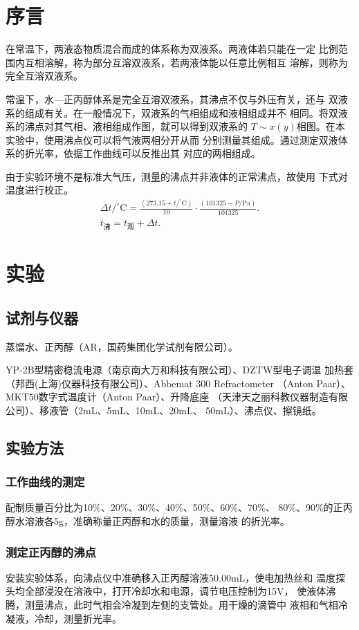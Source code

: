 \documentclass[12pt]{ctexart}
\numberwithin{equation}{section}
\begin{document}
\section{序言}
在常温下，两液态物质混合而成的体系称为双液系。两液体若只能在一定
比例范围内互相溶解，称为部分互溶双液系，若两液体能以任意比例相互
溶解，则称为完全互溶双液系。

常温下，水—正丙醇体系是完全互溶双液系，其沸点不仅与外压有关，还与
双液系的组成有关。在一般情况下，双液系的气相组成和液相组成并不
相同。将双液系的沸点对其气相、液相组成作图，就可以得到双液系的
$T\sim x(y)$相图。在本实验中，使用沸点仪可以将气液两相分开从而
分别测量其组成。通过测定双液体系的折光率，依据工作曲线可以反推出其
对应的两相组成。

由于实验环境不是标准大气压，测量的沸点并非液体的正常沸点，故使用
下式对温度进行校正。
\begin{gather}
    \Delta t / ^\circ\text{C}
    = \frac{(273.15 + t/^\circ\text{C})}{10}
    \cdot \frac{(101325 - P/\text{Pa})}{101325}. \\
    t_{\text{沸}} = t_{\text{观}} + \Delta t.
\end{gather}

\section{实验}
\subsection{试剂与仪器}
蒸馏水、正丙醇（AR，国药集团化学试剂有限公司）。

YP-2B型精密稳流电源（南京南大万和科技有限公司）、DZTW型电子调温
加热套（邦西(上海)仪器科技有限公司）、Abbemat 300 Refractometer
（Anton Paar）、MKT50数字式温度计（Anton Paar）、升降底座
（天津天之丽科教仪器制造有限公司）、移液管（2mL、5mL、10mL、20mL、
50mL）、沸点仪、擦镜纸。

\subsection{实验方法}
\subsubsection{工作曲线的测定}
配制质量百分比为10\%、20\%、30\%、40\%、50\%、60\%、70\%、
80\%、90\%的正丙醇水溶液各5g，准确称量正丙醇和水的质量，测量溶液
的折光率。

\subsubsection{测定正丙醇的沸点}
安装实验体系，向沸点仪中准确移入正丙醇溶液50.00mL，使电加热丝和
温度探头均全部浸没在溶液中，打开冷却水和电源，调节电压控制为15V，
使液体沸腾，测量沸点，此时气相会冷凝到左侧的支管处。用干燥的滴管中
液相和气相冷凝液，冷却，测量折光率。
\end{document}
